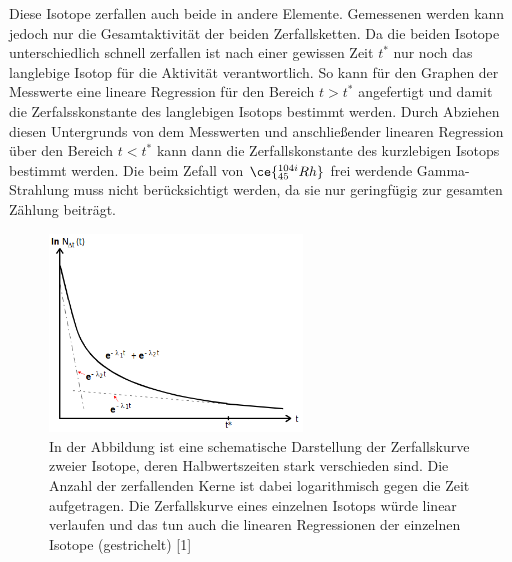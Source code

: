             \noindent
            Diese Isotope zerfallen auch beide in andere Elemente. Gemessenen werden kann jedoch nur die Gesamtaktivität der beiden Zerfallsketten. Da die beiden Isotope unterschiedlich schnell 
            zerfallen ist nach einer gewissen Zeit $t^*$ nur noch das langlebige Isotop für die Aktivität verantwortlich. So kann für den Graphen der Messwerte eine lineare Regression für den 
            Bereich $t>t^*$ angefertigt und damit die Zerfalsskonstante des langlebigen Isotops bestimmt werden. Durch Abziehen diesen Untergrunds von dem Messwerten und anschließender linearen 
            Regression über den Bereich $t<t^*$ kann dann die Zerfallskonstante des kurzlebigen Isotops bestimmt werden. Die beim Zefall von $\ce{^{104i}_{45}Rh}$ frei werdende Gamma-Strahlung
            muss nicht berücksichtigt werden, da sie nur geringfügig zur gesamten Zählung beiträgt. 

            \FloatBarrier

            \begin{figure}[h]
                \centering
                \includegraphics[width = 0.6\textwidth]{pictures/RhSchema.png}
                \caption{In der Abbildung ist eine schematische Darstellung der Zerfallskurve zweier Isotope, deren Halbwertszeiten stark verschieden sind. Die Anzahl der zerfallenden Kerne ist dabei logarithmisch gegen die Zeit aufgetragen. Die Zerfallskurve eines einzelnen Isotops würde linear verlaufen und das tun auch die linearen Regressionen der einzelnen Isotope (gestrichelt)  [1]}
                \label{fig:RhSchema}
            \end{figure}

            \FloatBarrier
